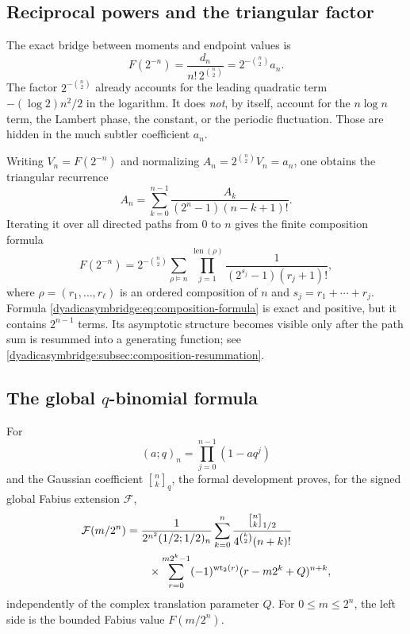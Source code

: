 \documentclass[11pt,oneside]{article}
\theoremstyle{definition}
\theoremstyle{remark}
\newcommand{\wt}{\operatorname{wt}_2}
\newcommand{\qbinom}[3]{\genfrac{[}{]}{0pt}{}{#1}{#2}_{#3}}
\begin{document}
\subsection{Reciprocal powers and the triangular factor}

The exact bridge between moments and endpoint values is
\begin{equation}
 \boxed{
 F(2^{-n})=\frac{d_n}{n!\,2^{\binom n2}}
 =2^{-\binom n2}a_n.}
\label{dyadicasymbridge:eq:inverse-exact}
\end{equation}
The factor $2^{-\binom n2}$ already accounts for the leading quadratic term
$-(\log2)n^2/2$ in the logarithm.  It does \emph{not}, by itself, account for the
$n\log n$ term, the Lambert phase, the constant, or the periodic fluctuation.  Those are hidden in the much subtler coefficient $a_n$.

Writing $V_n=F(2^{-n})$ and normalizing
$A_n=2^{\binom n2}V_n=a_n$, one obtains the triangular recurrence
\begin{equation}
 A_n=\sum_{k=0}^{n-1}
 \frac{A_k}{(2^n-1)(n-k+1)!}.
\label{dyadicasymbridge:eq:normalized-triangular}
\end{equation}
Iterating it over all directed paths from $0$ to $n$ gives the finite composition formula
\begin{equation}
 F(2^{-n})=2^{-\binom n2}
 \sum_{\rho\vDash n}
 \prod_{j=1}^{\operatorname{len}(\rho)}
 \frac1{(2^{s_j}-1)(r_j+1)!},
\label{dyadicasymbridge:eq:composition-formula}
\end{equation}
where $\rho=(r_1,\ldots,r_\ell)$ is an ordered composition of $n$ and
$s_j=r_1+\cdots+r_j$.  Formula \eqref{dyadicasymbridge:eq:composition-formula} is exact and positive, but it contains $2^{n-1}$ terms.  Its asymptotic structure becomes visible only after the path sum is resummed into a generating function; see \cref{dyadicasymbridge:subsec:composition-resummation}.

\subsection{The global \texorpdfstring{$q$}{q}-binomial formula}
\label{dyadicasymbridge:subsec:qformula}

For
\begin{equation}
 (a;q)_n=\prod_{j=0}^{n-1}(1-aq^j)
\label{dyadicasymbridge:eq:qpochhammer}
\end{equation}
and the Gaussian coefficient $\qbinom nkq$, the formal development proves, for the signed global Fabius extension $\mathcal F$,
\begin{align}
 \mathcal F(m/2^n)
 &=\frac{1}{2^{n^2}(1/2;1/2)_n}
 \sum_{k=0}^{n}
 \frac{\qbinom nk{1/2}}
 {4^{\binom k2}(n+k)!}                                    \notag\\
 &\qquad\times
 \sum_{r=0}^{m2^k-1}(-1)^{\wt(r)}
 (r-m2^k+Q)^{n+k},
\label{dyadicasymbridge:eq:qbinomial-global}
\end{align}
independently of the complex translation parameter $Q$.  For
$0\le m\le2^n$, the left side is the bounded Fabius value $F(m/2^n)$.
\end{document}
